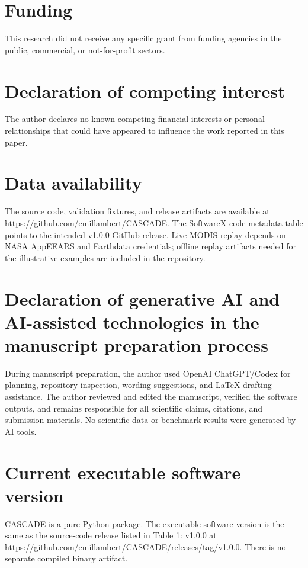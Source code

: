 \documentclass[preprint,12pt,a4paper]{elsarticle}
\begin{document}
\section*{Funding}

This research did not receive any specific grant from funding agencies in the public, commercial, or not-for-profit sectors.

\section*{Declaration of competing interest}

The author declares no known competing financial interests or personal relationships that could have appeared to influence the work reported in this paper.

\section*{Data availability}

The source code, validation fixtures, and release artifacts are available at \url{https://github.com/emillambert/CASCADE}. The SoftwareX code metadata table points to the intended v1.0.0 GitHub release. Live MODIS replay depends on NASA AppEEARS and Earthdata credentials; offline replay artifacts needed for the illustrative examples are included in the repository.

\section*{Declaration of generative AI and AI-assisted technologies in the manuscript preparation process}

During manuscript preparation, the author used OpenAI ChatGPT/Codex for planning, repository inspection, wording suggestions, and LaTeX drafting assistance. The author reviewed and edited the manuscript, verified the software outputs, and remains responsible for all scientific claims, citations, and submission materials. No scientific data or benchmark results were generated by AI tools.




\section*{Current executable software version}

CASCADE is a pure-Python package. The executable software version is the same as the source-code release listed in Table 1: v1.0.0 at \url{https://github.com/emillambert/CASCADE/releases/tag/v1.0.0}. There is no separate compiled binary artifact.
\end{document}

